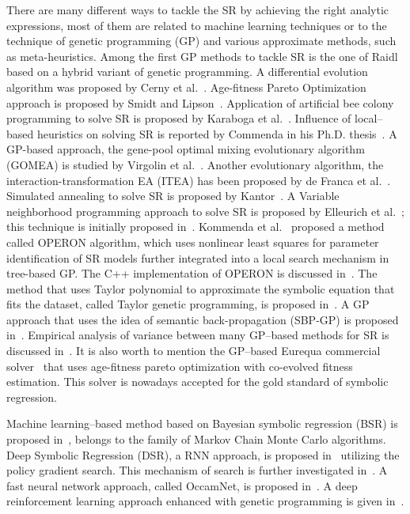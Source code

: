 \documentclass[a4paper,12pt]{elsarticle}
\begin{document}
	 There are many different ways to tackle the SR by achieving the right analytic expressions, most of them are related to machine learning techniques or to the technique of genetic programming (GP) and various approximate methods, such as meta-heuristics. Among the first GP methods to tackle SR is the one of Raidl~\cite{raidl1998hybrid} based on a hybrid variant of genetic programming. A differential evolution algorithm was proposed by Cerny et al.~\cite{cerny2008using}. Age-fitness Pareto Optimization approach is proposed by Smidt and Lipson~\cite{schmidt2010age}.  Application of artificial bee colony programming to solve SR is proposed by Karaboga et al.~\cite{karaboga2012artificial}. 
	 Influence of local--based heuristics on solving SR is reported by Commenda in his Ph.D. thesis~\cite{kommenda2018local}. A  GP-based approach, the gene-pool optimal mixing evolutionary algorithm (GOMEA) is studied by Virgolin et al.~\cite{virgolin2021improving}.  Another evolutionary algorithm, the interaction-transformation EA (ITEA) has been proposed by de Franca et al.~\cite{de2021interaction}. Simulated annealing to solve SR is proposed by Kantor~\cite{kantor2021simulated}. A Variable neighborhood programming approach to solve SR  is proposed by Elleurich et al.~\cite{elleuch2020variable}; this technique is initially proposed in~\cite{elleuch2016variable}. 
	 Kommenda et al.~\cite{kommenda2020parameter} proposed a method called OPERON algorithm, which uses nonlinear least squares for parameter identification of SR models further integrated into a local search mechanism in
	 tree-based GP. The C++ implementation of OPERON is discussed in~\cite{burlacu2020operon}. The method that uses Taylor polynomial to approximate the symbolic equation that fits the dataset, called Taylor genetic programming, is proposed in~\cite{he2022taylor}. A GP approach that uses the idea of semantic back-propagation (SBP-GP) is proposed in~\cite{virgolin2019linear}.   Empirical analysis of variance between many GP--based methods for SR is discussed in~\cite{kammerer2021empirical}. It is also worth to mention the GP--based Eurequa commercial solver~\cite{schmidt2009distilling, schmidt2011machine} that uses age-fitness pareto optimization  with co-evolved fitness estimation. This solver is nowadays accepted for the gold standard of symbolic regression.   
	 
	 
	 Machine learning--based method   based on Bayesian symbolic regression (BSR) is proposed in~\cite{jin2019bayesian},  belongs to the family of Markov Chain Monte Carlo algorithms. Deep Symbolic Regression (DSR), a RNN approach, is proposed in~\cite{petersen2019deep} utilizing the policy gradient search. This mechanism of search is further investigated in~\cite{landajuela2021improving}. A fast neural network approach, called OccamNet,  is proposed in~\cite{costa2020fast}.  A deep reinforcement learning approach enhanced with genetic programming is given in~\cite{mundhenk2021symbolic}. 
	
\end{document}
